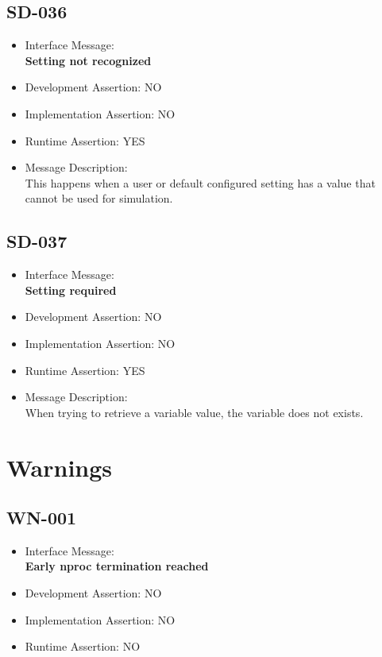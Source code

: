 \subsection{SD-036}
\begin{itemize}
  \item Interface Message:\\[1em]
    \textbf{Setting not recognized}
  \item Development Assertion: NO
  \item Implementation Assertion: NO
  \item Runtime Assertion: YES
  \item Message Description:\\[1em]
    This happens when a user or default configured setting has a value that cannot be used for simulation.
\end{itemize}

\subsection{SD-037}
\begin{itemize}
  \item Interface Message:\\[1em]
    \textbf{Setting required}
  \item Development Assertion: NO
  \item Implementation Assertion: NO
  \item Runtime Assertion: YES
  \item Message Description:\\[1em]
    When trying to retrieve a variable value, the variable does not exists.
\end{itemize}

\section{Warnings}

\subsection{WN-001}
\begin{itemize}
  \item Interface Message:\\[1em]
    \textbf{Early nproc termination reached}
  \item Development Assertion: NO
  \item Implementation Assertion: NO
  \item Runtime Assertion: NO
\end{itemize}

